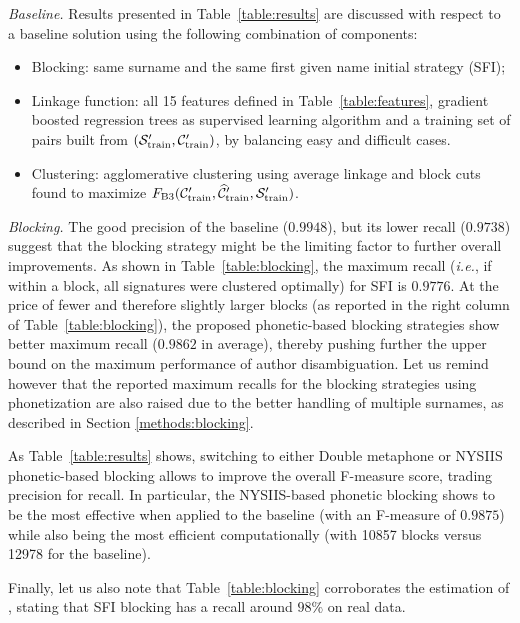 \documentclass[conference]{IEEEtran}
\newcommand{\ie}{\emph{i.e.}\xspace}
\begin{document}
\textit{Baseline.} Results presented in Table~\ref{table:results} are discussed with
respect to a baseline solution using the following combination of components:
\begin{itemize}
\item Blocking: same surname and the same first given name initial strategy (SFI);
\item Linkage function: all 15 features defined in Table~\ref{table:features},
    gradient boosted regression trees as supervised learning algorithm
    and a training set of pairs built from $({\cal S}_\text{train}^\prime, {\cal C}_\text{train}^\prime)$, by balancing easy and difficult cases.
\item Clustering: agglomerative clustering using average linkage and
    block cuts found to maximize $F_\text{B3}({\cal C}_\text{train}^\prime, \widehat{\cal C}_\text{train}^\prime, {\cal S}_\text{train}^\prime)$.
\end{itemize}


\textit{Blocking.} The good precision of the baseline ($0.9948$), but its
lower recall ($0.9738$) suggest that the blocking strategy might be the
limiting factor to further overall improvements.
As shown in Table~\ref{table:blocking}, the maximum recall (\ie, if within a block, all signatures were clustered optimally) for SFI is $0.9776$.
At the price of fewer and therefore slightly larger blocks (as reported in the right column of Table~\ref{table:blocking}), the
proposed phonetic-based blocking strategies show better maximum recall ($0.9862$ in average), thereby pushing further the upper bound on the maximum
performance of author disambiguation.
Let us remind however that the reported maximum recalls for the blocking strategies using phonetization are
also raised due to the better handling of multiple surnames, as described in Section \ref{methods:blocking}.

As Table~\ref{table:results} shows, switching to either Double metaphone or NYSIIS phonetic-based blocking allows
to improve the overall F-measure score, trading precision for recall.
In particular, the NYSIIS-based phonetic blocking shows to be the most effective when applied
to the baseline (with an F-measure of $0.9875$) while also being the most
efficient computationally (with 10857 blocks versus 12978 for the baseline).

Finally, let us also note that Table~\ref{table:blocking} corroborates the
estimation of \cite{torvik2009author}, stating that SFI blocking has a recall
around $98\%$ on real data.
\end{document}
